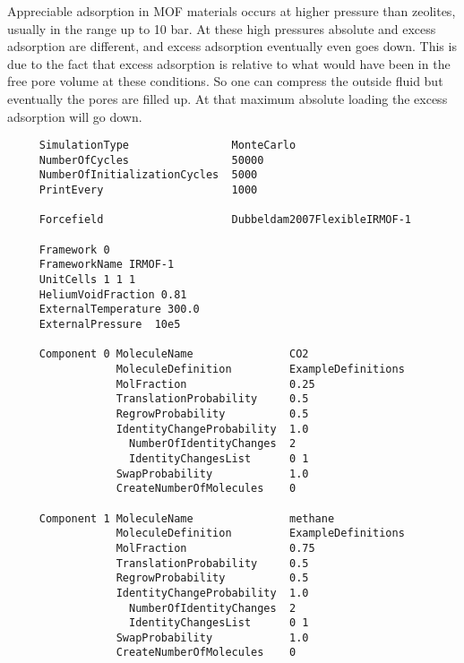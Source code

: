 Appreciable adsorption in MOF materials occurs at higher pressure than zeolites, usually in the range up to 10 bar. At these high pressures
absolute and excess adsorption are different, and excess adsorption eventually even goes down. This is due to the fact that excess adsorption is relative
to what would have been in the free pore volume at these conditions. So one can compress the outside fluid but eventually the pores are filled up. At that
maximum absolute loading the excess adsorption will go down.
\begin{tiny}
\begin{verbatim}
     SimulationType                MonteCarlo
     NumberOfCycles                50000
     NumberOfInitializationCycles  5000
     PrintEvery                    1000

     Forcefield                    Dubbeldam2007FlexibleIRMOF-1

     Framework 0
     FrameworkName IRMOF-1
     UnitCells 1 1 1
     HeliumVoidFraction 0.81
     ExternalTemperature 300.0
     ExternalPressure  10e5

     Component 0 MoleculeName               CO2
                 MoleculeDefinition         ExampleDefinitions
                 MolFraction                0.25
                 TranslationProbability     0.5
                 RegrowProbability          0.5
                 IdentityChangeProbability  1.0
                   NumberOfIdentityChanges  2
                   IdentityChangesList      0 1
                 SwapProbability            1.0
                 CreateNumberOfMolecules    0

     Component 1 MoleculeName               methane
                 MoleculeDefinition         ExampleDefinitions
                 MolFraction                0.75
                 TranslationProbability     0.5
                 RegrowProbability          0.5
                 IdentityChangeProbability  1.0
                   NumberOfIdentityChanges  2
                   IdentityChangesList      0 1
                 SwapProbability            1.0
                 CreateNumberOfMolecules    0
\end{verbatim}
\end{tiny}

